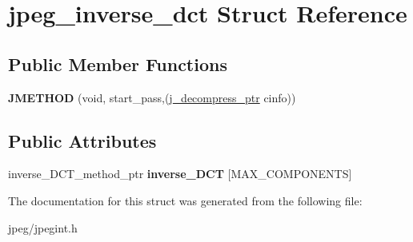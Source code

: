 \hypertarget{structjpeg__inverse__dct}{}\section{jpeg\+\_\+inverse\+\_\+dct Struct Reference}
\label{structjpeg__inverse__dct}
\subsection*{Public Member Functions}
\begin{DoxyCompactItemize}
\item 
{\bfseries J\+M\+E\+T\+H\+OD} (void, start\+\_\+pass,(\hyperlink{structjpeg__decompress__struct}{j\+\_\+decompress\+\_\+ptr} cinfo))\hypertarget{structjpeg__inverse__dct_a2e9c37cdc48deba795ea5ede7834a3c0}{}\label{structjpeg__inverse__dct_a2e9c37cdc48deba795ea5ede7834a3c0}

\end{DoxyCompactItemize}
\subsection*{Public Attributes}
\begin{DoxyCompactItemize}
\item 
inverse\+\_\+\+D\+C\+T\+\_\+method\+\_\+ptr {\bfseries inverse\+\_\+\+D\+CT} \mbox{[}M\+A\+X\+\_\+\+C\+O\+M\+P\+O\+N\+E\+N\+TS\mbox{]}\hypertarget{structjpeg__inverse__dct_aa05e35a50f28daf199d2efa702a72c2a}{}\label{structjpeg__inverse__dct_aa05e35a50f28daf199d2efa702a72c2a}

\end{DoxyCompactItemize}


The documentation for this struct was generated from the following file\+:\begin{DoxyCompactItemize}
\item 
jpeg/jpegint.\+h\end{DoxyCompactItemize}
